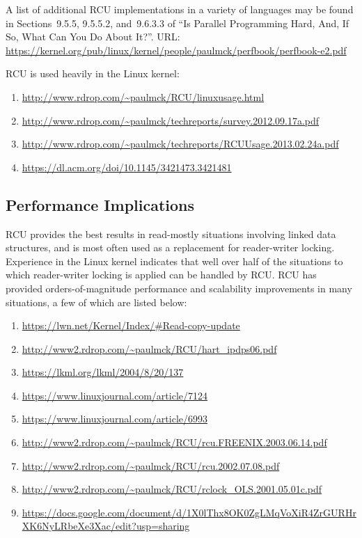 A list of additional RCU implementations in a variety of languages
may be found in Sections~9.5.5, 9.5.5.2, and~9.6.3.3 of
``Is Parallel Programming Hard, And, If So, What Can You Do About It?''.
URL: \url{https://kernel.org/pub/linux/kernel/people/paulmck/perfbook/perfbook-e2.pdf}

RCU is used heavily in the Linux kernel:

\begin{enumerate}
\item	\url{http://www.rdrop.com/~paulmck/RCU/linuxusage.html}
\item	\url{http://www.rdrop.com/~paulmck/techreports/survey.2012.09.17a.pdf}
\item	\url{http://www.rdrop.com/~paulmck/techreports/RCUUsage.2013.02.24a.pdf}
\item	\url{https://dl.acm.org/doi/10.1145/3421473.3421481}
\end{enumerate}

\subsection{Performance Implications}
\label{sec:Performance Implications}

RCU provides the best results in read-mostly situations involving linked
data structures, and is most often used as a replacement for reader-writer
locking.
Experience in the Linux kernel indicates that well over half of the
situations to which reader-writer locking is applied can be handled
by RCU.
RCU has provided orders-of-magnitude performance and scalability
improvements in many situations, a few of which are listed below:

\begin{enumerate}
\item	\url{https://lwn.net/Kernel/Index/#Read-copy-update}
\item	\url{http://www2.rdrop.com/~paulmck/RCU/hart_ipdps06.pdf}
\item	\url{https://lkml.org/lkml/2004/8/20/137}
\item	\url{https://www.linuxjournal.com/article/7124}
\item	\url{https://www.linuxjournal.com/article/6993}
\item	\url{http://www2.rdrop.com/~paulmck/RCU/rcu.FREENIX.2003.06.14.pdf}
\item	\url{http://www2.rdrop.com/~paulmck/RCU/rcu.2002.07.08.pdf}
\item	\url{http://www2.rdrop.com/~paulmck/RCU/rclock_OLS.2001.05.01c.pdf}
\item	\url{https://docs.google.com/document/d/1X0lThx8OK0ZgLMqVoXiR4ZrGURHrXK6NyLRbeXe3Xac/edit?usp=sharing}
\end{enumerate}


